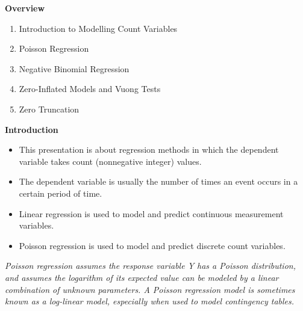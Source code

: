 \documentclass[MASTER.tex]{subfiles}
\begin{document}
\begin{frame}
\Large
\noindent \textbf{Overview}
\begin{enumerate}
\item Introduction to Modelling Count Variables
\item Poisson Regression
\item Negative Binomial Regression
\item Zero-Inflated Models and Vuong Tests
\item Zero Truncation
\end{enumerate}

\end{frame}

\begin{frame}
	\Large
\textbf{Introduction}
\begin{itemize}
\item This presentation is about regression methods in which the dependent variable takes
 count (nonnegative integer) values. \smallskip \item The dependent variable is usually the number of times an event occurs in a certain period of time.
\end{itemize}
\end{frame}
\begin{frame}[fragile]
\large
	\begin{itemize}
		\item Linear regression is used to model and predict continuous measurement variables.
		\item Poisson regression is used to model and predict discrete count variables.
	\end{itemize}
	\textit{Poisson regression assumes the response variable Y has a Poisson distribution, and assumes the logarithm of its expected value can be modeled by a linear combination of unknown parameters. A Poisson regression model is sometimes known as a log-linear model, especially when used to model contingency tables.}
	
\end{frame}
\end{document}
